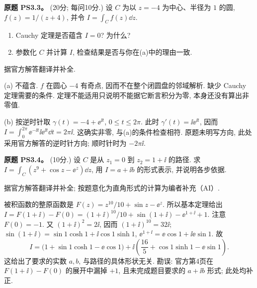 \begin{exercise}\label{ass:ps3-3}
\textbf{原题 PS3.3。} (20分; 每问10分.)
设 $C$ 为以 $z=-4$ 为中心、半径为 $1$ 的圆, $f(z)=1/(z+4)$, 并令 $I=\int_Cf(z)\dd z$.
\begin{enumerate}[label=(\alph*)]
\item Cauchy 定理是否蕴含 $I=0$? 为什么?
\item 参数化 $C$ 并计算 $I$, 检查结果是否与你在(a)中的理由一致.
\end{enumerate}
\end{exercise}
\begin{solution}
据官方解答翻译并补全.

(a) 不蕴含. $f$ 在圆心 $-4$ 有奇点, 因而不在整个闭圆盘的邻域解析. 缺少 Cauchy 定理需要的条件. 定理不能适用只说明不能据它断言积分为零, 本身还没有算出非零值.

(b) 按逆时针取 $\gamma(t)=-4+\ee^{\ii t}$, $0\le t\le2\pi$. 此时 $\gamma'(t)=\ii\ee^{\ii t}$, 因而
$I=\int_0^{2\pi}\ee^{-\ii t}\ii\ee^{\ii t}\dd t=2\pi\ii$.
这确实非零, 与(a)的条件检查相符. 原题未明写方向, 此处采用官方解答的逆时针方向; 顺时针时为 $-2\pi\ii$.
\end{solution}

\begin{exercise}\label{ass:ps3-4}
\textbf{原题 PS3.4。} (10分.) 设 $C$ 是从 $z_1=0$ 到 $z_2=1+\ii$ 的路径.
求 $I=\int_C(z^9+\cos z-\ee^z)\dd z$, 用 $I=a+\ii b$ 的形式表示, 并说明各步依据.
\end{exercise}
\begin{solution}
据官方解答翻译并补全; 按题意化为直角形式的计算为编者补充（AI）.

被积函数的整原函数是 $F(z)=z^{10}/10+\sin z-\ee^z$.
所以基本定理给出
$I=F(1+\ii)-F(0)=(1+\ii)^{10}/10+\sin(1+\ii)-\ee^{1+\ii}+1$.
注意 $F(0)=-1$.
又 $(1+\ii)^2=2\ii$, 因而 $(1+\ii)^{10}=32\ii$;
$\sin(1+\ii)=\sin1\cosh1+\ii\cos1\sinh1$,
$\ee^{1+\ii}=\ee\cos1+\ii\ee\sin1$. 故
\[
 I=\bigl(1+\sin1\cosh1-\ee\cos1\bigr)
 +\ii\left(\frac{16}{5}+\cos1\sinh1-\ee\sin1\right).
\]
这给出了要求的实数 $a,b$, 与路径的具体形状无关.
勘误: 官方第4页在 $F(1+\ii)-F(0)$ 的展开中漏掉 $+1$, 且未完成题目要求的 $a+\ii b$ 形式; 此处均补正.
\end{solution}


